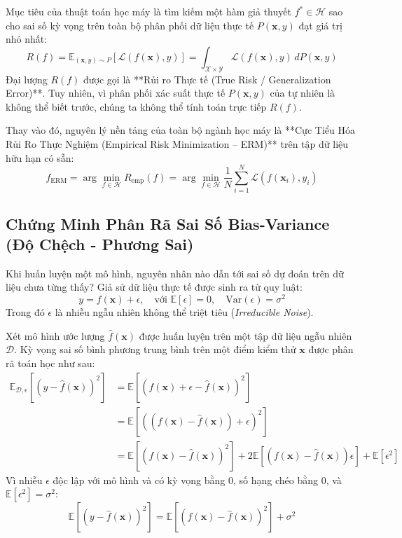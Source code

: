 Mục tiêu của thuật toán học máy là tìm kiếm một hàm giả thuyết $f^* \in \mathcal{H}$ sao cho sai số kỳ vọng trên toàn bộ phân phối dữ liệu thực tế $P(\mathbf{x}, y)$ đạt giá trị nhỏ nhất:
\begin{equation}
R(f) = \mathbb{E}_{(\mathbf{x}, y) \sim P}[\mathcal{L}(f(\mathbf{x}), y)] = \int_{\mathcal{X} \times \mathcal{Y}} \mathcal{L}(f(\mathbf{x}), y) \, dP(\mathbf{x}, y)
\label{eq:true-risk-def}
\end{equation}
Đại lượng $R(f)$ được gọi là **Rủi ro Thực tế (True Risk / Generalization Error)**. Tuy nhiên, vì phân phối xác suất thực tế $P(\mathbf{x}, y)$ của tự nhiên là không thể biết trước, chúng ta không thể tính toán trực tiếp $R(f)$. 

Thay vào đó, nguyên lý nền tảng của toàn bộ ngành học máy là **Cực Tiểu Hóa Rủi Ro Thực Nghiệm (Empirical Risk Minimization -- ERM)** trên tập dữ liệu hữu hạn có sẵn:
\begin{equation}
f_{\text{ERM}} = \arg\min_{f \in \mathcal{H}} R_{\text{emp}}(f) = \arg\min_{f \in \mathcal{H}} \frac{1}{N} \sum_{i=1}^N \mathcal{L}(f(\mathbf{x}_i), y_i)
\label{eq:erm-def}
\end{equation}

\subsection{Chứng Minh Phân Rã Sai Số Bias-Variance (Độ Chệch - Phương Sai)}

Khi huấn luyện một mô hình, nguyên nhân nào dẫn tới sai số dự đoán trên dữ liệu chưa từng thấy? Giả sử dữ liệu thực tế được sinh ra từ quy luật:
\begin{equation}
y = f(\mathbf{x}) + \epsilon, \quad \text{với } \mathbb{E}[\epsilon] = 0, \quad \text{Var}(\epsilon) = \sigma^2
\end{equation}
Trong đó $\epsilon$ là nhiễu ngẫu nhiên không thể triệt tiêu (\textit{Irreducible Noise}).

Xét mô hình ước lượng $\hat{f}(\mathbf{x})$ được huấn luyện trên một tập dữ liệu ngẫu nhiên $\mathcal{D}$. Kỳ vọng sai số bình phương trung bình trên một điểm kiểm thử $\mathbf{x}$ được phân rã toán học như sau:
\begin{align}
\mathbb{E}_{\mathcal{D}, \epsilon}[(y - \hat{f}(\mathbf{x}))^2] &= \mathbb{E}[(f(\mathbf{x}) + \epsilon - \hat{f}(\mathbf{x}))^2] \nonumber \\
&= \mathbb{E}[( (f(\mathbf{x}) - \hat{f}(\mathbf{x})) + \epsilon )^2] \nonumber \\
&= \mathbb{E}[(f(\mathbf{x}) - \hat{f}(\mathbf{x}))^2] + 2 \mathbb{E}[(f(\mathbf{x}) - \hat{f}(\mathbf{x}))\epsilon] + \mathbb{E}[\epsilon^2]
\end{align}
Vì nhiễu $\epsilon$ độc lập với mô hình và có kỳ vọng bằng 0, số hạng chéo bằng 0, và $\mathbb{E}[\epsilon^2] = \sigma^2$:
\begin{equation}
\mathbb{E}[(y - \hat{f}(\mathbf{x}))^2] = \mathbb{E}[(f(\mathbf{x}) - \hat{f}(\mathbf{x}))^2] + \sigma^2
\label{eq:bias-var-step1}
\end{equation}

